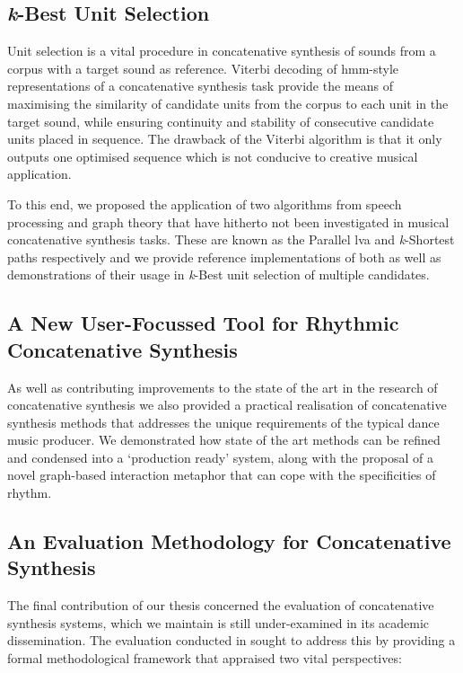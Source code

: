 \subsection{\textit{k}-Best Unit Selection}

Unit selection is a vital procedure in concatenative synthesis of sounds from a corpus with a target sound as reference. Viterbi decoding of \acrshort{hmm}-style representations of a concatenative synthesis task provide the means of maximising the similarity of candidate units from the corpus to each unit in the target sound, while ensuring continuity and stability of consecutive candidate units placed in sequence. The drawback of the Viterbi algorithm is that it only outputs one optimised sequence which is not conducive to creative musical application. 

To this end, we proposed the application of two  algorithms from speech processing and graph theory that have hitherto not been investigated in musical concatenative synthesis tasks. These are known as the Parallel \acrshort{lva} and \textit{k}-Shortest paths respectively and we provide reference implementations of both as well as demonstrations of their usage in \textit{k}-Best unit selection of multiple candidates.

\subsection{A New User-Focussed Tool for Rhythmic Concatenative Synthesis}

As well as contributing improvements to the state of the art in the research of concatenative synthesis we also provided a practical realisation of concatenative synthesis methods that addresses the unique requirements of the typical dance music producer. We demonstrated how state of the art methods can be refined and  condensed into a `production ready' system, along with the proposal of a novel graph-based interaction metaphor that can cope with the specificities of rhythm. 

\subsection{An Evaluation Methodology for Concatenative Synthesis}

The final contribution of our thesis concerned the evaluation of concatenative synthesis systems, which we maintain is still under-examined in its academic dissemination. The evaluation conducted in  sought to address this by providing a formal methodological framework that appraised two vital perspectives:

